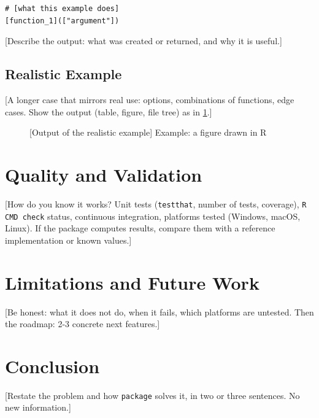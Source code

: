 \begin{lstlisting}
# [what this example does]
[function_1](["argument"])
\end{lstlisting}

[Describe the output: what was created or returned, and why it is useful.]

\subsection{Realistic Example}
[A longer case that mirrors real use: options, combinations of functions, edge cases. Show the output (table, figure, file tree) as in \cref{fig:output}.]

\begin{figure}[htbp]
    \centering
    \caption{[Output of the realistic example] Example: a figure drawn in R}
    \label{fig:output}
\end{figure}

\section{Quality and Validation}\label{sec:quality} %
[How do you know it works? Unit tests (\texttt{testthat}, number of tests, coverage), \texttt{R CMD check} status, continuous integration, platforms tested (Windows, macOS, Linux). If the package computes results, compare them with a reference implementation or known values.]

\section{Limitations and Future Work}\label{sec:limits} %
[Be honest: what it does not do, when it fails, which platforms are untested. Then the roadmap: 2-3 concrete next features.]

\section{Conclusion}\label{sec:conclusion} %
[Restate the problem and how \texttt{{{package}}} solves it, in two or three sentences. No new information.]

